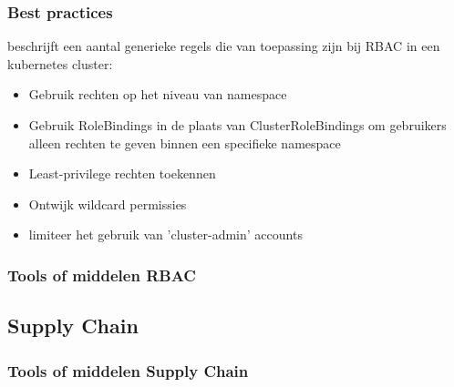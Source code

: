 \subsubsection{Best practices}
\textcite{KubernetesDocs-2023} beschrijft een aantal generieke regels die van toepassing zijn bij RBAC in een kubernetes cluster:
\begin{itemize}
    \item Gebruik rechten op het niveau van namespace
    \item Gebruik RoleBindings in de plaats van ClusterRoleBindings om gebruikers alleen rechten te geven binnen een specifieke namespace
    \item Least-privilege rechten toekennen
    \item Ontwijk wildcard permissies
    \item limiteer het gebruik van 'cluster-admin' accounts
\end{itemize}



\subsubsection{Tools of middelen RBAC}


\subsection{Supply Chain}

\subsubsection{Tools of middelen Supply Chain}





